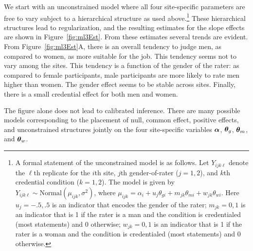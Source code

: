 \documentclass[english,man]{apa6}
\theoremstyle{definition}
\theoremstyle{definition}
\theoremstyle{remark}
\begin{document}
We start with an unconstrained model where all four site-specific
parameters are free to vary subject to a hierarchical structure as used
above.\footnote{A formal statement of the unconstrained model is as
  follows. Let \(Y_{ijk\ell}\) denote the \(\ell\)th replicate for the
  \(i\)th site, \(j\)th gender-of-rater (\(j=1,2\)), and \(k\)th
  credential condition (\(k=1,2\)). The model is given by
  \(Y_{ijk\ell}\sim \mbox{Normal}(\mu_{ijk},\sigma^2)\), where
  \(\mu_{ijk}=\alpha_i +u_j\theta_{gi}+m_{jk}\theta_{mi}+w_{jk}\theta_{wi}\).
  Here \(u_j=-.5,.5\) is an indicator that encodes the gender of the
  rater; \(m_{jk}=0,1\) is an indicator that is 1 if the rater is a man
  and the condition is credentialed (most statements) and 0 otherwise;
  \(w_{jk}=0,1\) is an indicator that is 1 if the rater is a woman and
  the condition is credentialed (most statements) and 0 otherwise.}
These hierarchical structures lead to regularization, and the resulting
estimates for the slope effects are shown in Figure~\ref{fig:ml3Est}.
From these estimates several trends are evident. From
Figure~\ref{fig:ml3Est}A, there is an overall tendency to judge men, as
compared to women, as more suitable for the job. This tendency seems not
to vary among the sites. This tendency is a function of the gender of
the rater: as compared to female participants, male participants are
more likely to rate men higher than women. The gender effect seems to be
stable across sites. Finally, there is a small credential effect for
both men and women.

The figure alone does not lead to calibrated inference. There are many
possible models corresponding to the placement of null, common effect,
positive effects, and unconstrained structures jointly on the four
site-specific variables \(\bm \alpha\), \(\bm \theta_g\), \(\bm \theta_m\),
and \(\bm \theta_w\).
\end{document}
